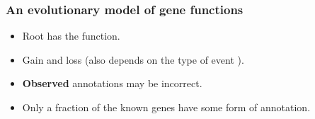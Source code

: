 \documentclass[aspectratio=169, 9pt]{beamer}
\begin{document}
\begin{frame}[label=aphylographicalview,c]
	\frametitle{An evolutionary model of gene functions}
	\def\shadowsize{2pt}
	
	\begin{minipage}[m]{.60\linewidth}
		\begin{figure}
			\footnotesize
			\centering
			\def\svgwidth{.9\linewidth}
		\end{figure}
	\end{minipage}
	\hfill
	\begin{minipage}[m]{.38\linewidth}
		\pause
		\begin{itemize}
			\item \textcolor{rootnode}{Root has the function.}\pause[4]
			\item \textcolor{innernode}{Gain\pause{} and loss\pause{} (also depends on the type of event \hyperlink{duplicationvsspeciation}{}}).\pause
			\item \textcolor{leafnode}{\textbf{Observed} annotations may be incorrect.}\pause
			\item Only a fraction of the known genes have some form of annotation.
		\end{itemize}
	\end{minipage}
	
\end{frame}


\end{document}
